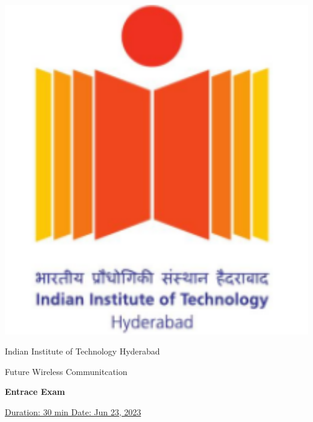 \documentclass[12pt, a4paper]{exam}
\begin{document}
	\noindent
	\begin{minipage}[l]{0.1\textwidth}
		\noindent
		\includegraphics[width=1.6\textwidth]{figs/logo.png}
	\end{minipage}
\hfill
\begin{minipage}[c]{0.8\textwidth}
	\begin{center}
		\large	Indian Institute of Technology Hyderabad \par
		\large	Future Wireless Communitcation \par
	\large \textbf{Entrace Exam}%
	\end{center}
\end{minipage}
\par
\vspace{0.2in}
\noindent
\uline{Duration: 30 min \hfill Date: Jun 23, 2023}%
\par 
\vspace{0.15in}
\noindent
\centering
\end{document}
